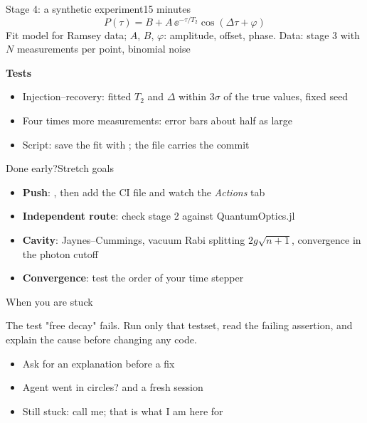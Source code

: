 \begin{frame}{Stage 4: a synthetic experiment}{15 minutes}
  \begin{equation*}
    P(\tau) = B + A\,\ee^{-\tau/T_2}\cos(\Delta\tau + \varphi)
  \end{equation*}
  {\scriptsize\color{unibasGrey}Fit model for Ramsey data; $A$, $B$, $\varphi$: amplitude,
   offset, phase. Data: stage 3 with $N$ measurements per point, binomial noise}

  \vspace{1ex}
  \textbf{Tests}
  \begin{itemize}
    \item<2-> Injection--recovery: fitted $T_2$ and $\Delta$ within $3\sigma$ of the true
          values, fixed seed
    \item<3-> Four times more measurements: error bars about half as large
    \item<4-> Script: save the fit with ; the file carries the commit
  \end{itemize}
\end{frame}

\begin{frame}{Done early?}{Stretch goals}
  \begin{itemize}
    \item \textbf{Push}: ,
          then add the CI file and watch the \emph{Actions} tab
    \item<2-> \textbf{Independent route}: check stage 2 against QuantumOptics.jl
    \item<3-> \textbf{Cavity}: Jaynes--Cummings, vacuum Rabi splitting $2g\sqrt{n+1}$,
          convergence in the photon cutoff
    \item<4-> \textbf{Convergence}: test the order of your time stepper
  \end{itemize}
  {\scriptsize\color{unibasGrey}}
\end{frame}

\begin{frame}[fragile]{When you are stuck}
\begin{prompt}
The test "free decay" fails. Run only that testset, read the failing
assertion, and explain the cause before changing any code.
\end{prompt}
  \begin{itemize}
    \item<2-> Ask for an explanation before a fix
    \item<3-> Agent went in circles?  and a fresh session
    \item<4-> Still stuck: call me; that is what I am here for
  \end{itemize}
\end{frame}
